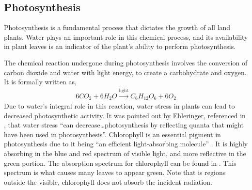 \subsection{Photosynthesis}

Photosynthesis is a fundamental process that dictates the growth of all land plants.  Water plays an important role in this chemical process, and its availability in plant leaves is an indicator of the plant's ability to perform photosynthesis.

The chemical reaction undergone during photosynthesis involves the conversion of carbon dioxide and water with light energy, to create a carbohydrate and oxygen.  It is formally written as,
%
\begin{align}
    6CO_2 + 6H_2O \xrightarrow{\text{light}} C_6H_12O_6 + 6O_2
\end{align}
%
Due to water's integral role in this reaction, water stress in plants can lead to decreased photosynthetic activity.  It was pointed out by Ehleringer, referenced in \cite{akinci}, that water stress “can decrease…photosynthesis by reflecting quanta that might have been used in photosynthesis”.   Chlorophyll is an essential pigment in photosynthesis due to it being “an efficient light-absorbing molecule” \cite{ecophysiology}.  It is highly absorbing in the blue and red spectrum of visible light, and more reflective in the green portion.  The absorption spectrum for chlorophyll can be found in \cite{chemistry}. This spectrum is what causes many leaves to appear green.  Note that is regions outside the visible, chlorophyll does not absorb the incident radiation.
